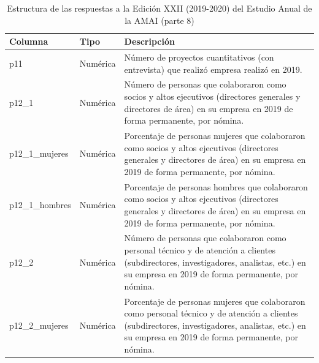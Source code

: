 \begin{table}[]
\caption{Estructura de las respuestas a la Edición XXII (2019-2020) del Estudio Anual de la AMAI (parte 8)}
\label{tab:raw2019_8}
\begin{tabular}{|l|l|l|}
\hline
Columna & Tipo & Descripción \\ \hline
p11 &
  Numérica &
  \parbox[t]{8cm}{Número de proyectos cuantitativos (con entrevista) que realizó empresa realizó en 2019.\vspace{0.1cm}} \\ \hline
p12\_1 &
  Numérica &
  \parbox[t]{8cm}{Número de personas que colaboraron como socios y altos ejecutivos (directores generales y directores de área) en su empresa en 2019 de forma permanente, por nómina.\vspace{0.1cm}} \\ \hline
p12\_1\_mujeres &
  Numérica &
  \parbox[t]{8cm}{Porcentaje de personas mujeres que colaboraron como socios y altos ejecutivos (directores generales y directores de área) en su empresa en 2019 de forma permanente, por nómina.\vspace{0.1cm}} \\ \hline
p12\_1\_hombres &
  Numérica &
  \parbox[t]{8cm}{Porcentaje de personas hombres que colaboraron como socios y altos ejecutivos (directores generales y directores de área)  en su empresa en 2019 de forma permanente, por nómina.\vspace{0.1cm}} \\ \hline
p12\_2 &
  Numérica &
  \parbox[t]{8cm}{Número de personas que colaboraron como personal técnico y de atención a clientes (subdirectores, investigadores, analistas, etc.) en su empresa en 2019 de forma permanente, por nómina.\vspace{0.1cm}} \\ \hline
p12\_2\_mujeres &
  Numérica &
  \parbox[t]{8cm}{Porcentaje de personas mujeres que colaboraron como personal técnico y de atención a clientes (subdirectores, investigadores, analistas, etc.) en su empresa en 2019 de forma permanente, por nómina.\vspace{0.1cm}} \\ \hline
\end{tabular}
\end{table}


